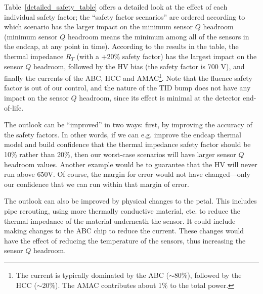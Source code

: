 Table~\ref{detailed_safety_table} offers a detailed look at the effect of each individual safety
factor; the ``safety factor scenarios'' are ordered according to which scenario has the larger impact
on the minimum sensor $Q$ headroom (minimum sensor $Q$ headroom means the minimum among all of the sensors in
the endcap, at any point in time). According to the results in the table, the thermal impedance
$R_T$ (with a +20\% safety factor) has the largest impact on the sensor $Q$ headroom,
followed by the HV bias (the safety factor is 700 V), and finally the
currents of the ABC, HCC and AMAC\footnote{
The current is typically dominated by the ABC ($\sim$80\%), followed by the HCC ($\sim$20\%). The AMAC
contributes about 1\% to the total power.}.
Note that the fluence safety factor is out of our control, and the nature of the TID bump does not
have any impact on the sensor $Q$ headroom, since its effect is minimal at the detector end-of-life.

The outlook can be ``improved'' in two ways: first, by improving the accuracy of the safety factors.
In other words, if we can e.g. improve the endcap thermal model and build confidence that the thermal
impedance safety factor should be 10\% rather than 20\%, then our worst-case scenarios will have
larger sensor $Q$ headroom values. Another example would be to guarantee that the HV will never run
above 650V. Of course, the margin for error would not have changed---only our confidence that we can
run within that margin of error.

The outlook can also be improved by physical changes to the petal. This includes pipe rerouting, 
using more thermally conductive material, etc. to reduce the thermal impedance of the material
underneath the sensor. It could include making changes to the ABC chip to reduce the current.
These changes would have the effect of reducing the temperature of the sensors, thus increasing the
sensor $Q$ headroom.

